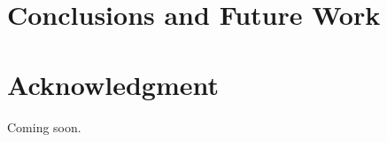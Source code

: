 \documentclass[10pt,conference]{IEEEtran}
\begin{document}


\section{Conclusions and Future Work}



\section*{Acknowledgment}
Coming soon.



\end{document}

